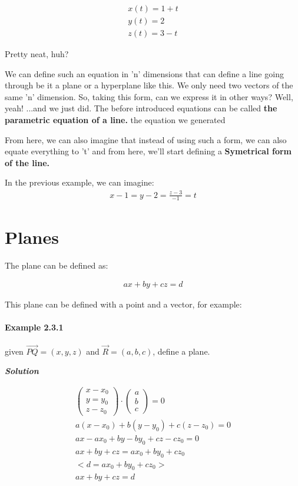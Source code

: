 \documentclass[11pt,fleqn]{book} %
\begin{document}
\begin{gather}
    x(t) = 1 + t \\ 
    y(t) = 2 \\
    z(t) = 3-t
\end{gather}

Pretty neat, huh?

We can define such an equation in 'n' dimensions that can define a line going through be it a plane or a hyperplane like this. We only need two vectors of the same 'n' dimension.
So, taking this form, can we express it in other ways? Well, yeah! ...and we just did. The before introduced equations can be called \textbf{the parametric equation of a line.}
the equation we generated


From here, we can also imagine that instead of using such a form, we can also equate everything to 't' and from here, we'll start defining a \textbf{Symetrical form of the line.}

In the previous example, we can imagine:
\begin{gather}
    x - 1 = y - 2 = \frac{z-3}{-1} = t    
\end{gather}

\section{Planes}

The plane can be defined as:

\begin{gather}
    ax + by + cz = d
\end{gather}

This plane can be defined with a point and a vector, for example:

\paragraph*{Example 2.3.1}
given $\vec{PQ} = (x,y,z)$ and $\vec{R} = (a,b,c)$, define a plane.

\textit{\textbf{Solution}}

\begin{gather}
    \begin{pmatrix}
        x - x_0 \\ y = y_0 \\ z - z_0
    \end{pmatrix} \cdot \begin{pmatrix}
        a\\b\\c
    \end{pmatrix} = 0\\
    a(x - x_0) + b(y - y_0) + c(z - z_0) = 0 \\
    ax - ax_0 + by - by_0 + cz - cz_0 = 0 \\
    ax + by + cz = ax_0 + by_0 + cz_0\\
    <d = ax_0 + by_0 + cz_0> \\
    ax + by + cz = d
\end{gather}
\end{document}
